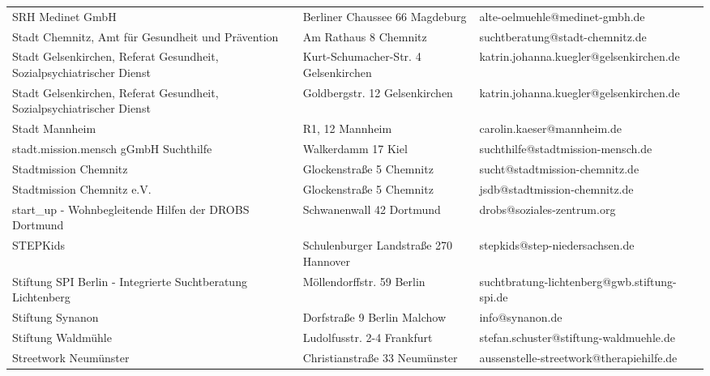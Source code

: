 {\begin{xltabular}{\textwidth} {
 >{\raggedright\arraybackslash}p{5cm}
 >{\raggedright\arraybackslash}X
 >{\raggedright\arraybackslash}p{5cm} }
SRH Medinet GmbH & Berliner Chaussee 66 Magdeburg & alte-oelmuehle@medinet-gmbh.de \\
Stadt Chemnitz, Amt für Gesundheit und Prävention & Am Rathaus 8 Chemnitz & suchtberatung@stadt-chemnitz.de \\
Stadt Gelsenkirchen, Referat Gesundheit, Sozialpsychiatrischer Dienst & Kurt-Schumacher-Str. 4 Gelsenkirchen & katrin.johanna.kuegler@gelsenkirchen.de \\
Stadt Gelsenkirchen, Referat Gesundheit, Sozialpsychiatrischer Dienst & Goldbergstr. 12 Gelsenkirchen & katrin.johanna.kuegler@gelsenkirchen.de \\
Stadt Mannheim & R1, 12 Mannheim & carolin.kaeser@mannheim.de \\
stadt.mission.mensch gGmbH Suchthilfe & Walkerdamm 17 Kiel & suchthilfe@stadtmission-mensch.de \\
Stadtmission Chemnitz & Glockenstraße 5 Chemnitz & sucht@stadtmission-chemnitz.de \\
Stadtmission Chemnitz e.V. & Glockenstraße 5 Chemnitz & jsdb@stadtmission-chemnitz.de \\
start\_up - Wohnbegleitende Hilfen der DROBS Dortmund & Schwanenwall 42 Dortmund & drobs@soziales-zentrum.org \\
STEPKids & Schulenburger Landstraße 270 Hannover & stepkids@step-niedersachsen.de \\
Stiftung SPI Berlin - Integrierte Suchtberatung Lichtenberg & Möllendorffstr. 59 Berlin & suchtbratung-lichtenberg@gwb.stiftung-spi.de \\
Stiftung Synanon & Dorfstraße 9 Berlin Malchow & info@synanon.de \\
Stiftung Waldmühle & Ludolfusstr. 2-4 Frankfurt & stefan.schuster@stiftung-waldmuehle.de \\
Streetwork Neumünster & Christianstraße 33 Neumünster & aussenstelle-streetwork@therapiehilfe.de \\

\end{xltabular}}
